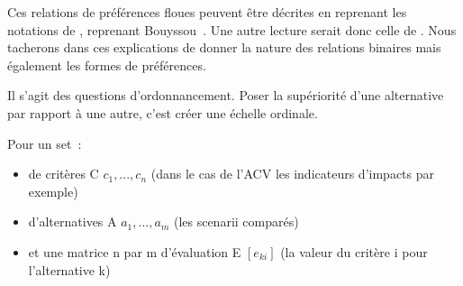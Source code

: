 Ces relations de préférences floues peuvent être décrites en reprenant les notations de \citeauthor{rowley_aggregating_2012}, reprenant Bouyssou~\cite{rowley_aggregating_2012}.
Une autre lecture serait donc celle de \cite[3.7.1 Pointwise evaluations on an ordinal scale]{bouyssou_evaluation_2006}.
Nous tacherons dans ces explications de donner la nature des relations binaires mais également les formes de préférences.

Il s'agit des questions d'ordonnancement.
Poser la supériorité d'une alternative par rapport à une autre, c'est créer une échelle ordinale.

Pour un set~:
\begin{itemize}
\item de critères C ${c_{1}, ...,c_{n}}$  (dans le cas de l'\gls{ACV} les indicateurs d'impacts par exemple)
\item d'alternatives A ${a_{1}, ...,a_{m}}$ (les scenarii comparés)
\item et une matrice n par m d'évaluation E $[e_{ki}]$ (la valeur du critère i pour l'alternative k)
\end{itemize}


